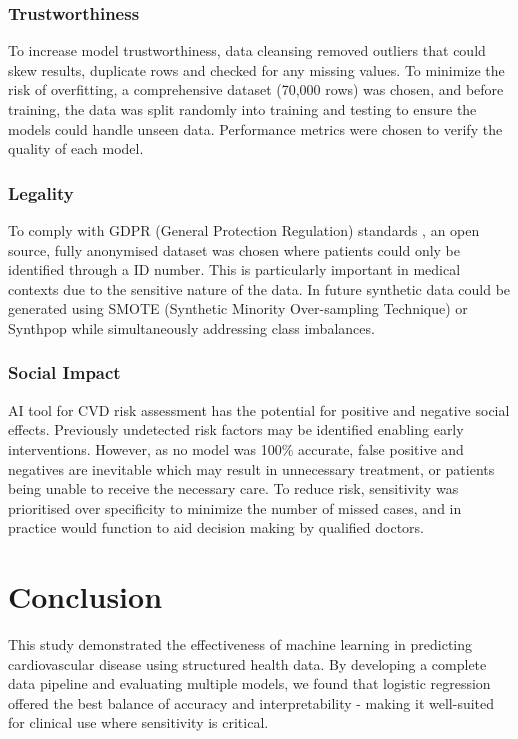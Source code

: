 \documentclass[conference]{IEEEtran}
\begin{document}
\subsubsection{Trustworthiness}
To increase model trustworthiness, data cleansing removed outliers that could skew results, duplicate rows and checked for any missing values. To minimize the risk of overfitting, a comprehensive dataset (70,000 rows) was chosen, and before training, the data was split randomly into training and testing to ensure the models could handle unseen data. Performance metrics were chosen to verify the quality of each model.
\subsubsection{Legality}
To comply with GDPR (General Protection Regulation) standards \cite{GDPR}, an open source, fully anonymised dataset was chosen where patients could only be identified through a ID number. This is particularly important in medical contexts due to the sensitive nature of the data. In future synthetic data could be generated using SMOTE (Synthetic Minority Over-sampling Technique) or Synthpop while simultaneously addressing class imbalances. 
\subsubsection{Social Impact}
AI tool for CVD risk assessment has the potential for positive and negative social effects. Previously undetected risk factors may be identified enabling early interventions. However, as no model was 100\% accurate, false positive and negatives are inevitable which may result in unnecessary treatment, or patients being unable to receive the necessary care. To reduce risk, sensitivity was prioritised over specificity to minimize the number of missed cases, and in practice would function to aid decision making by qualified doctors. 

\section{Conclusion}
This study demonstrated the effectiveness of machine learning in predicting cardiovascular disease using structured health data. By developing a complete data pipeline and evaluating multiple models, we found that logistic regression offered the best balance of accuracy and interpretability - making it well-suited for clinical use where sensitivity is critical.
\end{document}
